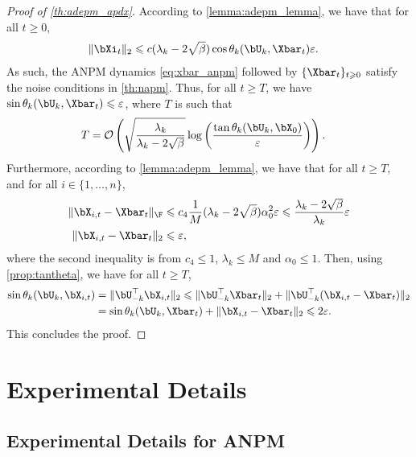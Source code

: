 \documentclass{article}
\theoremstyle{plain}
\theoremstyle{definition}
\theoremstyle{remark}
\begin{document}
\begin{proof}[Proof of \cref{th:adepm_apdx}]
  According to \cref{lemma:adepm_lemma}, we have that for all $t \geqslant 0$,
  \begin{align*}
    \Vert\bXi_t\Vert_2 & \leqslant c (\lambda_k - 2\sqrt{\beta}) \cos \theta_k(\bU_k, \Xbar_t) \varepsilon.
  \end{align*}
  As such, the ANPM dynamics \eqref{eq:xbar_anpm} followed by $\{\Xbar_t\}_{t\geqslant 0}$ satisfy the noise conditions in \cref{th:napm}. Thus, for all $t\geqslant T$, we have $\sin\theta_k(\bU_k,\Xbar_t) \leqslant \varepsilon$, where $T$ is such that
  \begin{align*}
    T & = \mathcal{O}\left( \sqrt{\frac{\lambda_k}{\lambda_k - 2\sqrt{\beta}}} \log\left( \frac{\tan\theta_k(\bU_k,\bX_0)}{\varepsilon } \right)\right).
  \end{align*}
  Furthermore, according to \cref{lemma:adepm_lemma}, we have that for all $t\geqslant T$, and for all $i\in \{1, \dots, n\}$,
  \begin{align*}
    \Vert\bX_{i,t} - \Xbar_t\Vert_\F & \leqslant c_4\frac{1}{M} (\lambda_k - 2\sqrt{\beta}) \alpha_0^2 \varepsilon \leqslant \frac{\lambda_k-2\sqrt{\beta}}{\lambda_k}\varepsilon \\
    \Vert\bX_{i,t} - \Xbar_t\Vert_2 & \leqslant \varepsilon,
  \end{align*}
  where the second inequality is from $c_4\leqslant 1$, $\lambda_k\leqslant M$ and $\alpha_0 \leqslant 1$. Then, using \cref{prop:tantheta}, we have for all $t\geqslant T$,
  \begin{align*}
    \sin \theta_k(\bU_k, \bX_{i,t}) & = \Vert\bU_{-k}^\top\bX_{i,t}\Vert_2 \leqslant \Vert\bU_{-k}^\top\Xbar_{t}\Vert_2 + \Vert\bU_{-k}^\top(\bX_{i,t} - \Xbar_t)\Vert_2 \\
    & = \sin\theta_k(\bU_k,\Xbar_t) + \Vert\bX_{i,t} - \Xbar_t\Vert_2 \leqslant 2\varepsilon.
  \end{align*}
  This concludes the proof.  
\end{proof}



\section{Experimental Details}\label{apdx:exp}

\subsection{Experimental Details for ANPM}\label{apdx:exp_anpm}
\end{document}
